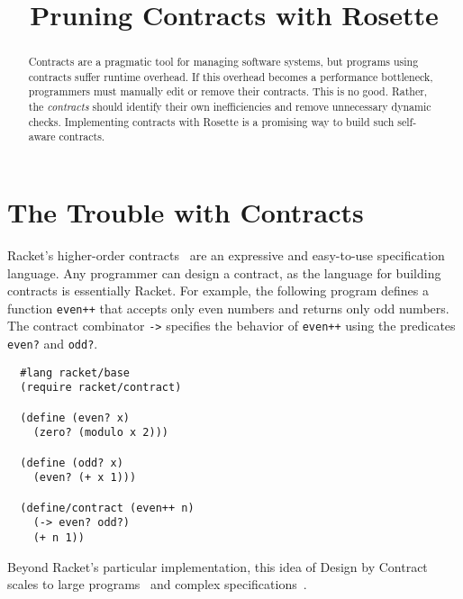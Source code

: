 \documentclass[nocopyrightspace,preprint,9pt]{sigplanconf}
\title{Pruning Contracts with Rosette}
\begin{document}
\maketitle

\begin{abstract}
  Contracts are a pragmatic tool for managing software systems, but programs using contracts suffer runtime overhead.
  If this overhead becomes a performance bottleneck, programmers must manually edit or remove their contracts.
  This is no good.
  Rather, the \emph{contracts} should identify their own inefficiencies and remove unnecessary dynamic checks.
  Implementing contracts with Rosette is a promising way to build such self-aware contracts.
\end{abstract}



\section{The Trouble with Contracts}

Racket's higher-order contracts~\cite{ff-icfp-2002} are an expressive and easy-to-use specification language.
Any programmer can design a contract, as the language for building contracts is essentially Racket.
For example, the following program defines a function {\tt even++} that accepts only even numbers and returns only odd numbers.
The contract combinator {\tt ->} specifies the behavior of {\tt even++} using the predicates {\tt even?} and {\tt odd?}.

\begin{verbatim}
  #lang racket/base
  (require racket/contract)

  (define (even? x)
    (zero? (modulo x 2)))

  (define (odd? x)
    (even? (+ x 1)))

  (define/contract (even++ n)
    (-> even? odd?)
    (+ n 1))
\end{verbatim}

\noindent Beyond Racket's particular implementation, this idea of Design by Contract~\cite{m-ieee-1992} scales to large programs~\cite{bjpw-eptcs-2010} and complex specifications~\cite{dnff-icfp-2016}.
\end{document}
